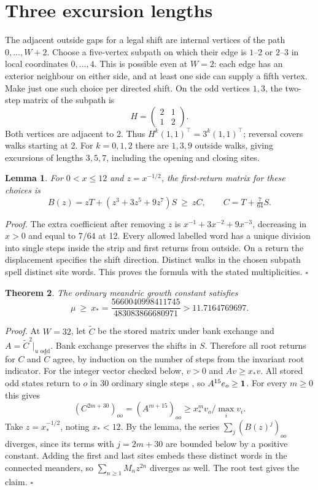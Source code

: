 \documentclass[11pt]{article}
\newtheorem{theorem}{Theorem}
\newtheorem{lemma}[theorem]{Lemma}
\newcommand{\xstar}{x_*}
\newcommand{\numx}{5660040998411745}
\newcommand{\denx}{483083866680971}
\begin{document}
\newpage
\section{Three excursion lengths}
The adjacent outside gaps for a legal shift are internal vertices of the path \(0,\ldots,W+2\). Choose a five-vertex subpath on which their edge is \(1\text{--}2\) or \(2\text{--}3\) in local coordinates \(0,\ldots,4\). This is possible even at \(W=2\): each edge has an exterior neighbour on either side, and at least one side can supply a fifth vertex. Make just one such choice per directed shift. On the odd vertices \(1,3\), the two-step matrix of the subpath is
\[
 H=\begin{pmatrix}2&1\\1&2\end{pmatrix}.
\]
Both vertices are adjacent to 2. Thus \(H^k(1,1)^{\top}=3^k(1,1)^{\top}\); reversal covers walks starting at 2. For \(k=0,1,2\) there are \(1,3,9\) outside walks, giving excursions of lengths \(3,5,7\), including the opening and closing sites.

\begin{lemma}
For \(0<x\le12\) and \(z=x^{-1/2}\), the first-return matrix for these choices is
\[
 B(z)=zT+(z^3+3z^5+9z^7)S\ \ge\ zC,\qquad C=T+\tfrac7{64}S .
\]
\end{lemma}
\noindent\textit{Proof.}
The extra coefficient after removing \(z\) is \(x^{-1}+3x^{-2}+9x^{-3}\), decreasing in \(x>0\) and equal to \(7/64\) at 12. Every allowed labelled word has a unique division into single steps inside the strip and first returns from outside. On a return the displacement specifies the shift direction. Distinct walks in the chosen subpath spell distinct site words. This proves the formula with the stated multiplicities. \hfill\(\square\)

\begin{theorem}
The ordinary meandric growth constant satisfies
\[
                  \mu \ \ge\ \xstar=\frac{\numx}{\denx}>11.7164769697.
\]
\end{theorem}
\noindent\textit{Proof.}
At \(W=32\), let \(\widetilde C\) be the stored matrix under bank exchange \cite[Sec.~3]{prior} and \(A=\widetilde C^2|_{u\text{ odd}}\). Bank exchange preserves the shifts in \(S\). Therefore all root returns for \(C\) and \(\widetilde C\) agree, by induction on the number of steps from the invariant root indicator. For the integer vector checked below, \(v>0\) and \(Av\ge\xstar v\). All stored odd states return to \(o\) in 30 ordinary single steps \cite{prior}, so \(A^{15}e_o\ge{\bf1}\). For every \(m\ge0\) this gives
\[
  (C^{2m+30})_{oo}=(A^{m+15})_{oo}
           \ge \xstar^m v_o/\max_i v_i.
\]
Take \(z=\xstar^{-1/2}\), noting \(\xstar<12\). By the lemma, the series \(\sum_j (B(z)^j)_{oo}\) diverges, since its terms with \(j=2m+30\) are bounded below by a positive constant. Adding the first and last sites embeds these distinct words in the connected meanders, so \(\sum_{n\ge1}M_nz^{2n}\) diverges as well. The root test gives the claim. \hfill\(\square\)
\end{document}
